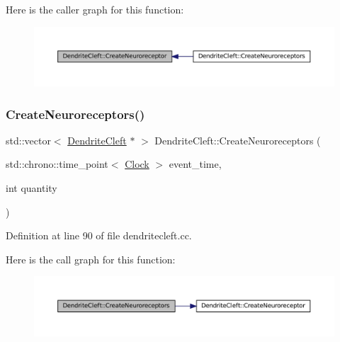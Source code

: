 Here is the caller graph for this function\+:\nopagebreak
\begin{figure}[H]
\begin{center}
\leavevmode
\includegraphics[width=350pt]{class_dendrite_cleft_ac84d3e0cafecd1436c34162f687e3851_icgraph}
\end{center}
\end{figure}
\mbox{\label{class_dendrite_cleft_ab34af5363b25c6498aee429725a1c7db}} 
\subsubsection{\texorpdfstring{Create\+Neuroreceptors()}{CreateNeuroreceptors()}}
{\footnotesize\ttfamily std\+::vector$<$ \mbox{\hyperlink{class_dendrite_cleft}{Dendrite\+Cleft}} $\ast$ $>$ Dendrite\+Cleft\+::\+Create\+Neuroreceptors (\begin{DoxyParamCaption}\item[{std\+::chrono\+::time\+\_\+point$<$ \mbox{\hyperlink{universe_8h_a0ef8d951d1ca5ab3cfaf7ab4c7a6fd80}{Clock}} $>$}]{event\+\_\+time,  }\item[{int}]{quantity }\end{DoxyParamCaption})}



Definition at line 90 of file dendritecleft.\+cc.

Here is the call graph for this function\+:\nopagebreak
\begin{figure}[H]
\begin{center}
\leavevmode
\includegraphics[width=350pt]{class_dendrite_cleft_ab34af5363b25c6498aee429725a1c7db_cgraph}
\end{center}
\end{figure}
\mbox{\label{class_dendrite_cleft_a86e9943d9d140c2a06d7e222812c9548}} 
